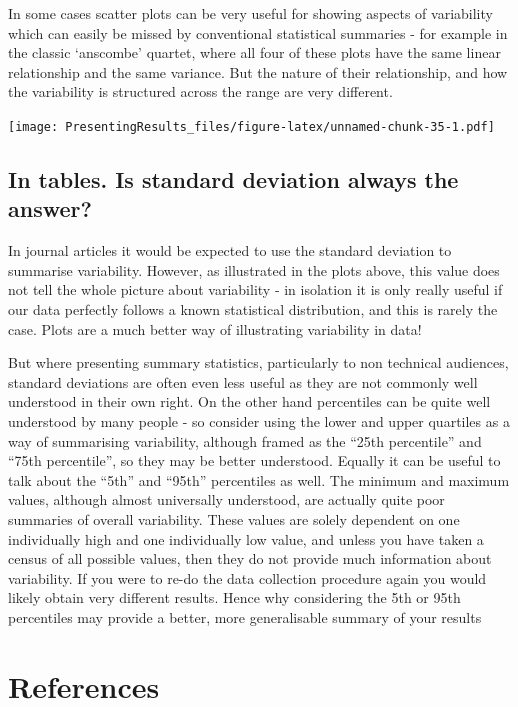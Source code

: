 \documentclass[
  titlepage]{book}
\begin{document}
In some cases scatter plots can be very useful for showing aspects of variability which can easily be missed by conventional statistical summaries - for example in the classic `anscombe' quartet, where all four of these plots have the same linear relationship and the same variance. But the nature of their relationship, and how the variability is structured across the range are very different.

\texttt{[image: PresentingResults\_files/figure-latex/unnamed-chunk-35-1.pdf]}

\hypertarget{in-tables.-is-standard-deviation-always-the-answer}{%
\subsection{In tables. Is standard deviation always the answer?}\label{in-tables.-is-standard-deviation-always-the-answer}}

In journal articles it would be expected to use the standard deviation to summarise variability.
However, as illustrated in the plots above, this value does not tell the whole picture about variability - in isolation it is only really useful if our data perfectly follows a known statistical distribution, and this is rarely the case. Plots are a much better way of illustrating variability in data!

But where presenting summary statistics, particularly to non technical audiences, standard deviations are often even less useful as they are not commonly well understood in their own right. On the other hand percentiles can be quite well understood by many people - so consider using the lower and upper quartiles as a way of summarising variability, although framed as the ``25th percentile'' and ``75th percentile'', so they may be better understood. Equally it can be useful to talk about the ``5th'' and ``95th'' percentiles as well. The minimum and maximum values, although almost universally understood, are actually quite poor summaries of overall variability. These values are solely dependent on one individually high and one individually low value, and unless you have taken a census of all possible values, then they do not provide much information about variability. If you were to re-do the data collection procedure again you would likely obtain very different results. Hence why considering the 5th or 95th percentiles may provide a better, more generalisable summary of your results

\hypertarget{references}{%
\section{References}\label{references}}
\end{document}
